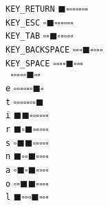 \documentclass[a4paper]{article}
\begin{document}
\verb|KEY_RETURN| $\blacksquare\square\square\square$\hspace{2cm}$\square\square\square\square$\\
\verb|KEY_ESC| $\square\blacksquare\square\square$\hspace{2cm}$\square\square\square\square$\\
\verb|KEY_TAB| $\square\square\blacksquare\square$\hspace{2cm}$\square\square\square\square$\\
\verb|KEY_BACKSPACE| $\square\square\square\blacksquare$\hspace{2cm}$\square\square\square\square$\\
\verb|KEY_SPACE| $\square\square\square\square$\hspace{2cm}$\blacksquare\square\square\square$\\
\verb| | $\square\square\square\square$\hspace{2cm}$\square\blacksquare\square\square$\\
\verb|e| $\square\square\square\square$\hspace{2cm}$\square\square\blacksquare\square$\\
\verb|t| $\square\square\square\square$\hspace{2cm}$\square\square\square\blacksquare$\\
\verb|i| $\blacksquare\blacksquare\square\square$\hspace{2cm}$\square\square\square\square$\\
\verb|r| $\blacksquare\square\blacksquare\square$\hspace{2cm}$\square\square\square\square$\\
\verb|s| $\square\blacksquare\blacksquare\square$\hspace{2cm}$\square\square\square\square$\\
\verb|n| $\blacksquare\square\square\blacksquare$\hspace{2cm}$\square\square\square\square$\\
\verb|a| $\square\blacksquare\square\blacksquare$\hspace{2cm}$\square\square\square\square$\\
\verb|o| $\square\square\blacksquare\blacksquare$\hspace{2cm}$\square\square\square\square$\\
\verb|l| $\blacksquare\square\square\square$\hspace{2cm}$\blacksquare\square\square\square$\\
\end{document}
